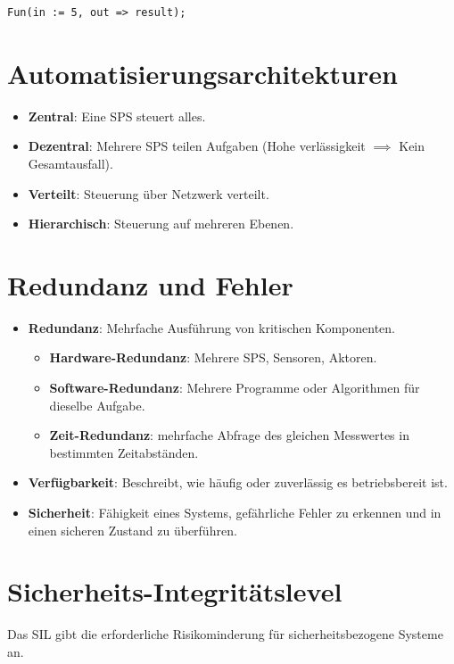 \documentclass[10pt, a3paper, landscape]{article}
\newcommand{\algo}[1]{\textbf{\textcolor{blue!60!black}{#1}}}
\newcommand{\datastruct}[1]{\textbf{\textcolor{red!60!black}{#1}}}
\begin{document}
\begin{multicols*}{4}
\begin{itemize}
\begin{itemize}
\begin{itemize}
\begin{lstlisting}[language=ST, numbers=none]
Fun(in := 5, out => result);

    \end{lstlisting}
\end{itemize}

\section{Automatisierungsarchitekturen}

\begin{itemize}
    \item \datastruct{Zentral}: Eine SPS steuert alles.
    \item \datastruct{Dezentral}: Mehrere SPS teilen Aufgaben (Hohe verlässigkeit $\implies$ Kein Gesamtausfall).
    \item \datastruct{Verteilt}: Steuerung über Netzwerk verteilt.
    \item \datastruct{Hierarchisch}: Steuerung auf mehreren Ebenen.
\end{itemize}

\section{Redundanz und Fehler}

\begin{itemize}
\item \algo{Redundanz}: Mehrfache Ausführung von kritischen Komponenten.
\begin{itemize}
    \item \datastruct{Hardware-Redundanz}: Mehrere SPS, Sensoren, Aktoren.
    \item \datastruct{Software-Redundanz}: Mehrere Programme oder Algorithmen für dieselbe Aufgabe.
    \item \datastruct{Zeit-Redundanz}: mehrfache Abfrage des gleichen Messwertes in bestimmten Zeitabständen.
\end{itemize}
\item \algo{Verfügbarkeit}: Beschreibt, wie häufig oder zuverlässig es betriebsbereit ist.
\item \algo{Sicherheit}: Fähigkeit eines Systems, gefährliche Fehler zu erkennen und in einen sicheren Zustand zu überführen. 

\end{itemize}

\section{Sicherheits-Integritätslevel}
Das SIL gibt die erforderliche Risikominderung für sicherheitsbezogene Systeme an.


\end{itemize}
\end{itemize}
\end{multicols*}
\end{document}
